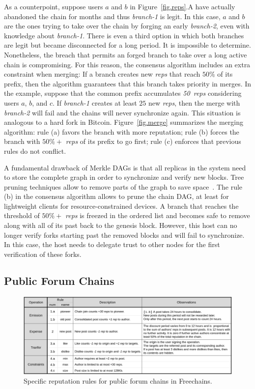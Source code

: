 \documentclass[10pt,journal,compsoc]{IEEEtran}
\newcommand{\FC}       {Freechains\xspace}
\newcommand{\reps}     {\emph{reps}\xspace}
\newcommand{\nreps}[1] {\emph{#1~reps\xspace}}
\begin{document}
As a counterpoint, suppose users $a$ and $b$ in Figure~\ref{fig.reps}.A have
actually abandoned the chain for months and thus \emph{branch-1} is legit.
In this case, $a$ and $b$ are the ones trying to take over the chain by
forging an early \emph{branch-2}, even with knowledge about \emph{branch-1}.
There is even a third option in which both branches are legit but became
disconnected for a long period.
It is impossible to determine.
Nonetheless, the breach that permits an forged branch to take over a long
active chain is compromising.
For this reason, the consensus algorithm includes an extra constraint when
merging:
If a branch creates new \reps that reach $50\%$ of its prefix, then the
algorithm guarantees that this branch takes priority in merges.
In the example, suppose that the common prefix accumulates \nreps{50}
considering users $a$, $b$, and $c$.
If \emph{branch-1} creates at least $25$ new \reps, then the merge with
\emph{branch-2} will fail and the chains will never synchronize again.
This situation is analogous to a hard fork in Bitcoin.
%
Figure~\ref{fig.merge} summarizes the merging algorithm:
    rule (a) favors the branch with more reputation;
    rule (b) forces the branch with $50\%+$ \reps of its prefix to go first;
    rule (c) enforces that previous rules do not conflict.

A fundamental drawback of Merkle DAGs is that all replicas in the system need
to store the complete graph in order to synchronize and verify new blocks.
Tree pruning techniques allow to remove parts of the graph to save
space~\cite{p2p.prune}.
The rule (b) in the consensus algorithm allows to prune the chain DAG, at least
for lightweight clients for resource-constrained devices.
A branch that reaches the threshold of $50\%+$ \reps is freezed in the ordered
list and becomes safe to remove along with all of its past back to the genesis
block.
However, this host can no longer verify forks starting past the removed blocks
and will fail to synchronize.
In this case, the host needs to delegate trust to other nodes for the first
verification of these forks.

\subsection{Public Forum Chains}
\label{sec.consensus.chains}

\begin{figure}
\centering
\includegraphics[width=\textwidth]{rules.png}
\caption{Specific reputation rules for public forum chains in \FC.}
\label{fig.rules}
\end{figure}
\end{document}

